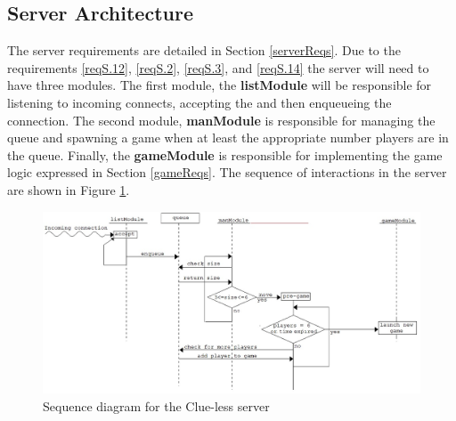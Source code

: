 \documentclass[10pt]{article}
\begin{document}
\subsection[Server Architecture]{Server Architecture}
The server requirements are detailed in Section \ref{serverReqs}.  Due to the requirements \ref{reqS.12}, \ref{reqS.2}, \ref{reqS.3}, and \ref{reqS.14} the server will need to have three modules.  The first module, the \textbf{listModule} will be responsible for listening to incoming connects, accepting the and then enqueueing the connection.  The second module, \textbf{manModule} is responsible for managing the queue and spawning a game when at least the appropriate number players are in the queue.  Finally, the \textbf{gameModule} is responsible for implementing the game logic expressed in Section \ref{gameReqs}.  The sequence of interactions in the server are shown in Figure \ref{serverSeq}.

\begin{figure}[ht]
\includegraphics[width=0.9\columnwidth]{serverSequence}
\caption{\label{serverSeq} Sequence diagram for the Clue-less server}
\end{figure}
\end{document}
